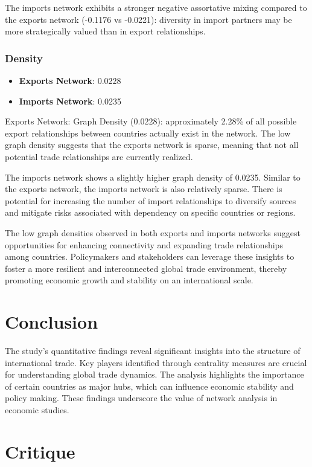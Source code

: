 \documentclass[12pt, a4paper]{article}
\begin{document}
The imports network exhibits a stronger negative assortative mixing compared to the exports network (-0.1176 vs -0.0221): diversity in import partners may be more strategically valued than in export relationships.
\subsubsection{Density}
\begin{itemize}
\item \textbf{Exports Network}: 0.0228
\item \textbf{Imports Network}: 0.0235
\end{itemize}
Exports Network: Graph Density (0.0228): approximately 2.28\% of all possible export relationships between countries actually exist in the network. The low graph density suggests that the exports network is sparse, meaning that not all potential trade relationships are currently realized.

The imports network shows a slightly higher graph density of 0.0235. Similar to the exports network, the imports network is also relatively sparse. There is potential for increasing the number of import relationships to diversify sources and mitigate risks associated with dependency on specific countries or regions.

The low graph densities observed in both exports and imports networks suggest opportunities for enhancing connectivity and expanding trade relationships among countries. Policymakers and stakeholders can leverage these insights to foster a more resilient and interconnected global trade environment, thereby promoting economic growth and stability on an international scale.
\section{Conclusion}
\label{conclusion}

The study's quantitative findings reveal significant insights into the structure of international trade. Key players identified through centrality measures are crucial for understanding global trade dynamics. The analysis highlights the importance of certain countries as major hubs, which can influence economic stability and policy making. These findings underscore the value of network analysis in economic studies.

\section{Critique}
\label{critique}
\end{document}
